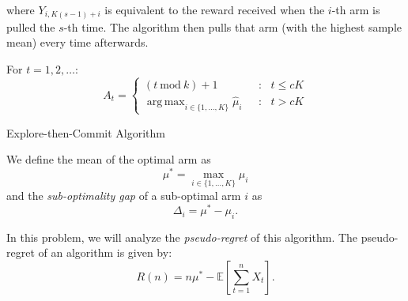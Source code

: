 \documentclass[12pt, addpoints]{exam}
\DeclareMathOperator*{\argmax}{arg\,max}
\begin{document}
\begin{questions}
where $Y_{i, K(s - 1) + i}$ is equivalent to the reward received when the $i$-th arm is pulled the $s$-th time. The algorithm then pulls that arm (with the highest sample mean) every time afterwards.
\begin{algorithm}[H]
For $t=1, 2, \ldots: $
\[ A_t=\begin{cases} (t \ \text{mod} \ k)+1 \ \ \ &: \ \ \ t\le cK \\ \argmax_{i \in \{1,\ldots, K\}} \hat \mu_i \ \ \ &: \ \ \ t>cK \end{cases} \]
\caption{Explore-then-Commit Algorithm}
\label{alg:etc}
\end{algorithm} 


We define the mean of the optimal arm as
\[ \mu^\ast=\max_{i \in \{1, \ldots, K\}}\mu_i\]
and the \textit{sub-optimality gap} of a sub-optimal arm $i$ as
\[ \Delta_i=\mu^*-\mu_i. \]

In this problem, we will analyze the \textit{pseudo-regret} of this algorithm. The pseudo-regret of an algorithm is given by:
\[ R(n)=n \mu^\ast - \mathbb{E}\left [\sum_{t=1}^n X_{t}\right].\]

\end{questions}
\end{document}
